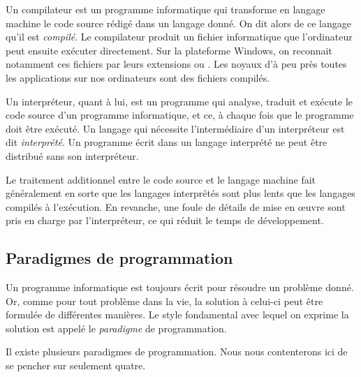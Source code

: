 Un compilateur est un programme informatique qui
transforme en langage machine le code source rédigé dans un langage
donné. On dit alors de ce langage qu'il est \emph{compilé}. Le compilateur produit un fichier
informatique que l'ordinateur peut ensuite exécuter directement. Sur
la plateforme Windows, on reconnait notamment ces fichiers par leurs
extensions  ou . Les noyaux d'à peu près toutes
les applications sur nos ordinateurs sont des fichiers compilés.

Un interpréteur, quant à lui, est un programme qui
analyse, traduit et exécute le code source d'un programme
informatique, et ce, à chaque fois que le programme doit être exécuté.
Un langage qui nécessite l'intermédiaire d'un interpréteur est dit
\emph{interprété}. Un programme écrit dans un langage interprété ne peut être distribué sans son
interpréteur.

Le traitement additionnel entre le code source et le langage machine
fait généralement en sorte que les langages interprétés sont plus
lents que les langages compilés à l'exécution. En revanche, une foule
de détails de mise en œuvre sont pris en charge par l'interpréteur, ce
qui réduit le temps de développement.


\subsection{Paradigmes de programmation}
\label{sec:informatique:concepts:paradigmes}

Un programme informatique est toujours écrit pour résoudre un problème
donné. Or, comme pour tout problème dans la vie, la solution à
celui-ci peut être formulée de différentes manières. Le style
fondamental avec lequel on exprime la solution est appelé le
\emph{paradigme} de programmation.

Il existe plusieurs paradigmes de programmation. Nous nous
contenterons ici de se pencher sur seulement quatre.

